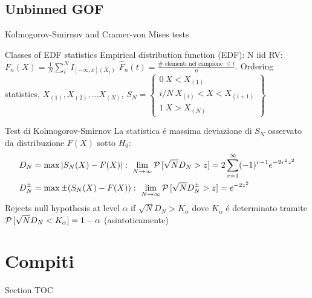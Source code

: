 \subsection{Unbinned GOF}

\begin{frame}{Kolmogorov-Smirnov and Cramer-von Mises tests}
\begin{block}{Classes of EDF statistics}
	Empirical distribution function (EDF): N iid RV: $F_n(X)=\frac{1}{N}\sum_i^NI_{[-\infty,x](X_i)}$ $\hat{F}_n(t)=\frac{\#\text{ elementi nel campione }\leq t}{n}$.
 Ordering statistics, $X_{(1)}, X_{(2)}, \ldots X_{(N)}$, $S_N=\left\{\begin{array}{c}0\ X<X_{(1)}\\i/N\ X_{(i)}<X<X_{(i+1)}\\1\ X>X_{(N)}\end{array}\right\}$
\end{block}

\begin{block}{Test di Kolmogorov-Smirnov }
La statistica \'e massima deviazione di $S_N$ osservato da distribuzione $F(X)$ sotto $H_0$:
\begin{align*}
&D_N=\max|S_N(X)-F(X)|:\ \lim_{N\to\infty}\prob{[\sqrt{N}D_N>z]}=2\sum_{r=1}^{\infty}(-1)\expy{r-1}\exp{-2r^2z^2}\\
&D_N^{\pm}=\max\pm(S_N(X)-F(X)):\ \lim_{N\to\infty}\prob{[\sqrt{N}D_N^{\pm}>z]}=\exp{-2z^2}
\end{align*}
Rejects null hypothesis at level $\alpha$ if $\sqrt{N}D_N>K_{\alpha}$ dove $K_{\alpha}$ \'e determinato tramite $\operatorname{\mathcal{P}}{[\sqrt{N}D_N<K_{\alpha}]}=1-\alpha$ (asintoticamente)
\end{block}
\end{frame}


\section{Compiti}

\begin{frame}[allowframebreaks]{Section TOC}
\tableofcontents[currentsection,sectionstyle=show/hide,subsectionstyle=show/show/hide]
\end{frame}

